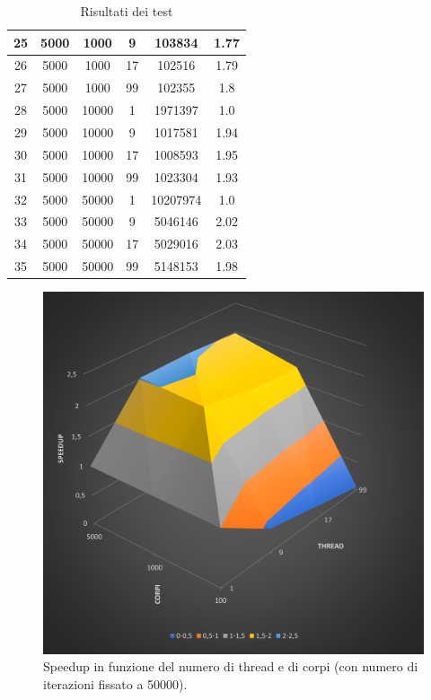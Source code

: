 \documentclass[12pt,a4paper,openright,twoside]{book}
\begin{document}
\begin{center}
\begin{table}
\begin{tabular}{ |c|c|c|c|c|c| }
			\hline
		   25 & 5000 & 1000 & 9 & 103834 & 1.77 \\ 
			\hline
		   26 & 5000 & 1000 & 17 & 102516 & 1.79 \\ 
			\hline
		   27 & 5000 & 1000 & 99 & 102355 & 1.8 \\ 
			\hline
		   28 & 5000 & 10000 & 1 & 1971397 & 1.0 \\ 
			\hline
		   29 & 5000 & 10000 & 9 & 1017581 & 1.94 \\ 
			\hline
		   30 & 5000 & 10000 & 17 & 1008593 & 1.95 \\ 
			\hline
		   31 & 5000 & 10000 & 99 & 1023304 & 1.93 \\ 
			\hline
		   32 & 5000 & 50000 & 1 & 10207974 & 1.0 \\ 
			\hline
		   33 & 5000 & 50000 & 9 & 5046146 & 2.02 \\ 
			\hline
		   34 & 5000 & 50000 & 17 & 5029016 & 2.03 \\ 
			\hline
		   35 & 5000 & 50000 & 99 & 5148153 & 1.98 \\ 
			\hline
		\end{tabular}
		\label{tab:table1}
		\caption{Risultati dei test}
	\end{table}
\end{center}

\begin{figure}
	\centering
	\includegraphics[width=\linewidth]{figures/speedup-plot.png}
	\caption{Speedup in funzione del numero di thread e di corpi (con numero di iterazioni fissato a 50000).}
	\label{fig:speedup}
\end{figure}
\end{document}
